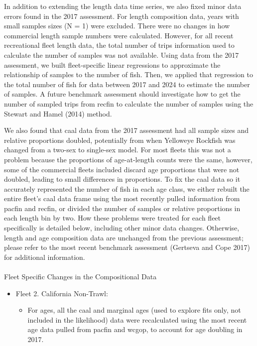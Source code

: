 \documentclass[
]{scrartcl}
\makeatletter
\let\oldparagraph\paragraph
\renewcommand{\paragraph}{
    \@ifstar
      \xxxParagraphStar
      \xxxParagraphNoStar
  }
\newcommand{\xxxParagraphStar}[1]{\oldparagraph*{#1}\mbox{}}
\newcommand{\xxxParagraphNoStar}[1]{\oldparagraph{#1}\mbox{}}
\providecommand{\tightlist}{%
  \setlength{\itemsep}{0pt}\setlength{\parskip}{0pt}}\usepackage{longtable,booktabs,array}
\makeatother
\begin{document}
In addition to extending the length data time series, we also fixed
minor data errors found in the 2017 assessment. For length composition
data, years with small samples sizes (N = 1) were excluded. There were
no changes in how commercial length sample numbers were calculated.
However, for all recent recreational fleet length data, the total number
of trips information used to calculate the number of samples was not
available. Using data from the 2017 assessment, we built fleet-specific
linear regressions to approximate the relationship of samples to the
number of fish. Then, we applied that regression to the total number of
fish for data between 2017 and 2024 to estimate the number of samples. A
future benchmark assessment should investigate how to get the number of
sampled trips from \gls{recfin} to calculate the number of samples using
the Stewart and Hamel (2014) method.

We also found that \gls{caal} data from the 2017 assessment had all
sample sizes and relative proportions doubled, potentially from when
Yelloweye Rockfish was changed from a two-sex to single-sex model. For
most fleets this was not a problem because the proportions of
age-at-length counts were the same, however, some of the commercial
fleets included discard age proportions that were not doubled, leading
to small differences in proportions. To fix the \gls{caal} data so it
accurately represented the number of fish in each age class, we either
rebuilt the entire fleet's \gls{caal} data frame using the most recently
pulled information from \gls{pacfin} and \gls{recfin}, or divided the
number of samples or relative proportions in each length bin by two. How
these problems were treated for each fleet specifically is detailed
below, including other minor data changes. Otherwise, length and age
composition data are unchanged from the previous assessment; please
refer to the most recent benchmark assessment (Gertseva and Cope 2017)
for additional information.

\paragraph{Fleet Specific Changes in the Compositional
Data}\label{fleet-specific-changes-in-the-compositional-data}

\begin{itemize}
\tightlist
\item
  Fleet 2. California Non-Trawl:

  \begin{itemize}
  \tightlist
  \item
    For ages, all the \gls{caal} and marginal ages (used to explore fits
    only, not included in the likelihood) data were recalculated using
    the most recent age data pulled from \gls{pacfin} and \gls{wcgop},
    to account for age doubling in 2017.
  \end{itemize}
\end{itemize}
\end{document}

